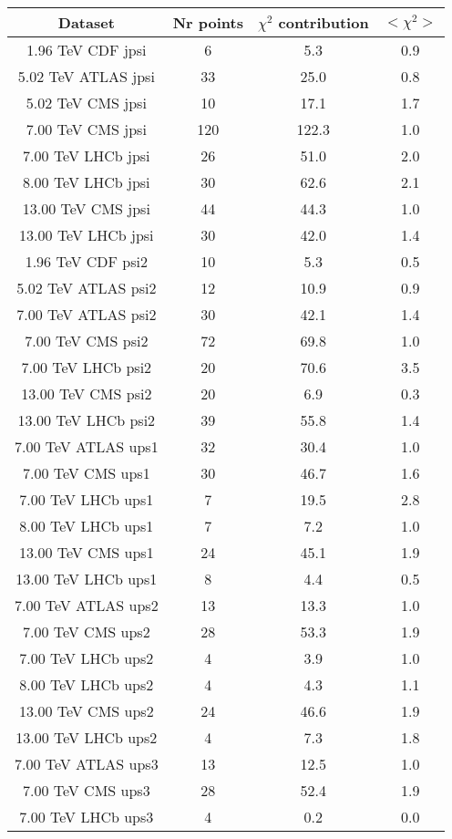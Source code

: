\begin{table}[h!]
\centering
\begin{tabular}{c|c|c|c}
Dataset & Nr points & $\chi^2$ contribution & $<\chi^2>$ \\
\hline
1.96 TeV CDF jpsi & 6 & 5.3 & 0.9 \\
5.02 TeV ATLAS jpsi & 33 & 25.0 & 0.8 \\
5.02 TeV CMS jpsi & 10 & 17.1 & 1.7 \\
7.00 TeV CMS jpsi & 120 & 122.3 & 1.0 \\
7.00 TeV LHCb jpsi & 26 & 51.0 & 2.0 \\
8.00 TeV LHCb jpsi & 30 & 62.6 & 2.1 \\
13.00 TeV CMS jpsi & 44 & 44.3 & 1.0 \\
13.00 TeV LHCb jpsi & 30 & 42.0 & 1.4 \\
1.96 TeV CDF psi2 & 10 & 5.3 & 0.5 \\
5.02 TeV ATLAS psi2 & 12 & 10.9 & 0.9 \\
7.00 TeV ATLAS psi2 & 30 & 42.1 & 1.4 \\
7.00 TeV CMS psi2 & 72 & 69.8 & 1.0 \\
7.00 TeV LHCb psi2 & 20 & 70.6 & 3.5 \\
13.00 TeV CMS psi2 & 20 & 6.9 & 0.3 \\
13.00 TeV LHCb psi2 & 39 & 55.8 & 1.4 \\
7.00 TeV ATLAS ups1 & 32 & 30.4 & 1.0 \\
7.00 TeV CMS ups1 & 30 & 46.7 & 1.6 \\
7.00 TeV LHCb ups1 & 7 & 19.5 & 2.8 \\
8.00 TeV LHCb ups1 & 7 & 7.2 & 1.0 \\
13.00 TeV CMS ups1 & 24 & 45.1 & 1.9 \\
13.00 TeV LHCb ups1 & 8 & 4.4 & 0.5 \\
7.00 TeV ATLAS ups2 & 13 & 13.3 & 1.0 \\
7.00 TeV CMS ups2 & 28 & 53.3 & 1.9 \\
7.00 TeV LHCb ups2 & 4 & 3.9 & 1.0 \\
8.00 TeV LHCb ups2 & 4 & 4.3 & 1.1 \\
13.00 TeV CMS ups2 & 24 & 46.6 & 1.9 \\
13.00 TeV LHCb ups2 & 4 & 7.3 & 1.8 \\
7.00 TeV ATLAS ups3 & 13 & 12.5 & 1.0 \\
7.00 TeV CMS ups3 & 28 & 52.4 & 1.9 \\
7.00 TeV LHCb ups3 & 4 & 0.2 & 0.0 \\

\end{tabular}
\end{table}
